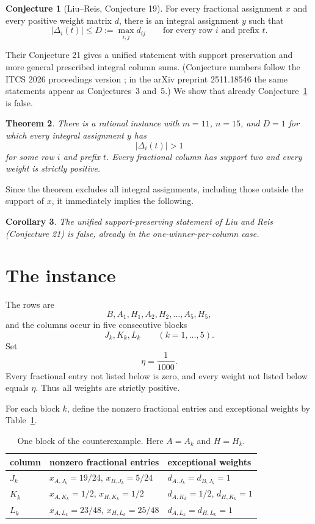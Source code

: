 \documentclass[11pt]{article}
\newtheorem{theorem}{Theorem}
\newtheorem{corollary}[theorem]{Corollary}
\theoremstyle{definition}
\newtheorem{conjecture}[theorem]{Conjecture}
\newcommand{\disc}{\Delta}
\begin{document}
\begin{conjecture}[Liu--Reis, Conjecture 19]\label{conj:machine}
For every fractional assignment $x$ and every positive weight matrix $d$,
there is an integral assignment $y$ such that
\[
 |\disc_i(t)|\le D:=\max_{i,j}d_{ij}
 \qquad\text{for every row $i$ and prefix $t$.}
\]
\end{conjecture}

Their Conjecture 21 gives a unified statement with support preservation and
more general prescribed integral column sums.  (Conjecture numbers follow the
ITCS 2026 proceedings version \citep{LiuReis2026}; in the arXiv preprint
2511.18546 the same statements appear as Conjectures~3 and~5.)  We show that
already Conjecture~\ref{conj:machine} is false.

\begin{theorem}\label{thm:main}
There is a rational instance with $m=11$, $n=15$, and $D=1$ for which every
integral assignment $y$ has
\[
 |\disc_i(t)|>1
\]
for some row $i$ and prefix $t$.  Every fractional column has support two and
every weight is strictly positive.
\end{theorem}

Since the theorem excludes all integral assignments, including those outside
the support of $x$, it immediately implies the following.

\begin{corollary}\label{cor:unified}
The unified support-preserving statement of Liu and Reis (Conjecture 21) is
false, already in the one-winner-per-column case.
\end{corollary}

\section{The instance}

The rows are
\[
 B,A_1,H_1,A_2,H_2,\ldots,A_5,H_5,
\]
and the columns occur in five consecutive blocks
\[
 J_k,K_k,L_k\qquad(k=1,\ldots,5).
\]
Set
\[
 \eta=\frac1{1000}.
\]
Every fractional entry not listed below is zero, and every weight not listed
below equals $\eta$.  Thus all weights are strictly positive.

For each block $k$, define the nonzero fractional entries and exceptional
weights by Table~\ref{tab:block}.

\begin{table}[ht]
\centering
\caption{One block of the counterexample.  Here $A=A_k$ and $H=H_k$.}
\label{tab:block}
\begin{tabular}{@{}lll@{}}
\toprule
column & nonzero fractional entries & exceptional weights \\
\midrule
$J_k$ & $x_{A,J_k}=19/24$, $x_{B,J_k}=5/24$
      & $d_{A,J_k}=d_{B,J_k}=1$ \\
$K_k$ & $x_{A,K_k}=1/2$, $x_{H,K_k}=1/2$
      & $d_{A,K_k}=1/2$, $d_{H,K_k}=1$ \\
$L_k$ & $x_{A,L_k}=23/48$, $x_{H,L_k}=25/48$
      & $d_{A,L_k}=d_{H,L_k}=1$ \\
\bottomrule
\end{tabular}
\end{table}
\end{document}
